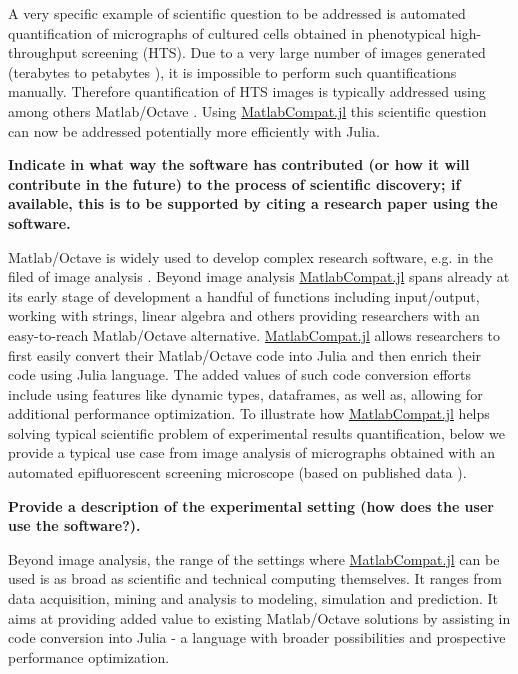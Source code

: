 A very specific example of scientific question to be addressed is automated quantification of micrographs of cultured cells obtained in phenotypical high-throughput screening (HTS). Due to a very large number of images generated (terabytes to petabytes \cite{R_m__2014}), it is impossible to perform such quantifications manually. Therefore quantification of HTS images is typically addressed using among others Matlab/Octave \cite{22787215, 17076895, R_m__2014}. Using \href{https://github.com/MatlabCompat/MatlabCompat.jl}{MatlabCompat.jl} this scientific question can now be addressed potentially more efficiently with Julia.

\textbf{Indicate in what way the software has contributed (or how it will contribute in the future) to the process of scientific discovery; if available, this is to be supported by citing a research paper using the software.}

Matlab/Octave is widely used to develop complex research software, e.g. in the filed of image analysis \cite{Kiss_2014, 17076895}. Beyond image analysis \href{https://github.com/MatlabCompat/MatlabCompat.jl}{MatlabCompat.jl} spans already at its early stage of development a handful of functions including input/output, working with strings, linear algebra and others providing researchers with an easy-to-reach Matlab/Octave alternative. \href{https://github.com/MatlabCompat/MatlabCompat.jl}{MatlabCompat.jl} allows researchers to first easily convert their Matlab/Octave code into Julia and then enrich their code using Julia language. The added values of such code conversion efforts include using features like dynamic types, dataframes, as well as, allowing for additional performance optimization. To illustrate how \href{https://github.com/MatlabCompat/MatlabCompat.jl}{MatlabCompat.jl} helps solving typical scientific problem of experimental results quantification, below we provide a typical use case from image analysis of micrographs obtained with an automated epifluorescent screening microscope (based on published data \cite{22787215}).

\textbf{Provide a description of the experimental setting (how does the user use the software?).}

Beyond image analysis, the range of the settings where \href{https://github.com/MatlabCompat/MatlabCompat.jl}{MatlabCompat.jl} can be used is as broad as scientific and technical computing themselves. It ranges from data acquisition, mining and analysis to modeling, simulation and prediction. It aims at providing added value to existing Matlab/Octave solutions by assisting in code conversion into Julia - a language with broader possibilities and prospective performance optimization.

